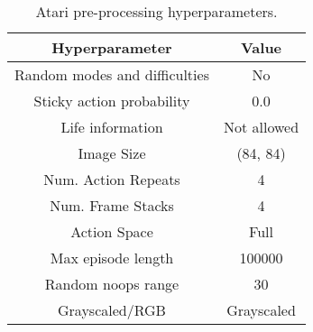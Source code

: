 \documentclass[nohyperref]{article}
\theoremstyle{plain}
\begin{document}
\begin{table}[H]
\begin{center}
\caption{Atari pre-processing hyperparameters.}
\label{tab:ale_process}
\begin{tabular}{|c|c|}
\hline
\textbf{Hyperparameter} & \textbf{Value}  \\
\hline
Random modes and difficulties & No \\
\hline
Sticky action probability  & 0.0 \\
\hline
Life information & Not allowed \\
\hline
Image Size & (84, 84) \\
\hline
Num. Action Repeats & 4 \\
\hline
Num. Frame Stacks & 4 \\
\hline
Action Space & Full \\
\hline
Max episode length   & 100000 \\
\hline
Random noops range  & 30\\
\hline
Grayscaled/RGB      & Grayscaled\\
\hline
\end{tabular}

\end{center}
\end{table}
\clearpage
\end{document}
